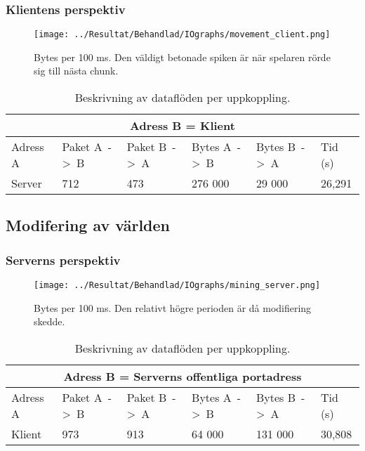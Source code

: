 \documentclass[journal,comsoc]{IEEEtran}
\begin{document}
\subsubsection{Klientens perspektiv}
\begin{figure} [H]
  \centering
  \texttt{[image: ../Resultat/Behandlad/IOgraphs/movement\_client.png]}
  \caption{Bytes per 100 ms. Den väldigt betonade spiken är när spelaren rörde sig till nästa chunk.}
  \label{fig:client:chunk}
\end{figure}
\begin{table} [H]
  \begin{center}
    \label{table:client:chunk}
    \begin{tabular}{ | m{1.5cm} |  m{1cm} | m{1cm}| m{1cm}|m{1cm}|m{0.75cm}| } 
      \hline
      \multicolumn{6}{|c|}{Adress B = Klient} \\
      \hline
      Adress A & Paket A~->~B & Paket B~->~A & Bytes A~->~B & Bytes B~->~A & Tid (s) \\
      \hline
      Server & 712 & 473 & 276 000 & 29 000 & 26,291 \\
      \hline 
    \end{tabular}
  \end{center}
  \caption{Beskrivning av dataflöden per uppkoppling.}
\end{table}
\subsection{Modifering av världen}
\subsubsection{Serverns perspektiv}
\begin{figure} [H]
  \centering
  \texttt{[image: ../Resultat/Behandlad/IOgraphs/mining\_server.png]}
  \caption{Bytes per 100 ms. Den relativt högre perioden är då modifiering skedde.}
  \label{fig:server:modify}
\end{figure}
\begin{table} [H]
  \begin{center}
    \label{table:server:modify}
    \begin{tabular}{ | m{1.5cm} |  m{1cm} | m{1cm}| m{1cm}|m{1cm}|m{0.75cm}| } 
      \hline
      \multicolumn{6}{|c|}{Adress B = Serverns offentliga portadress} \\
      \hline
      Adress A & Paket A~->~B & Paket B~->~A & Bytes A~->~B & Bytes B~->~A & Tid (s) \\
      \hline
      Klient & 973 & 913 & 64 000 & 131 000 & 30,808 \\
      \hline 
    \end{tabular}
  \end{center}
  \caption{Beskrivning av dataflöden per uppkoppling.}
\end{table}
\end{document}
